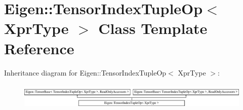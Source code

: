 \hypertarget{class_eigen_1_1_tensor_index_tuple_op}{}\section{Eigen\+:\+:Tensor\+Index\+Tuple\+Op$<$ Xpr\+Type $>$ Class Template Reference}
\label{class_eigen_1_1_tensor_index_tuple_op}
Inheritance diagram for Eigen\+:\+:Tensor\+Index\+Tuple\+Op$<$ Xpr\+Type $>$\+:\begin{figure}[H]
\begin{center}
\leavevmode
\includegraphics[height=1.206897cm]{class_eigen_1_1_tensor_index_tuple_op}
\end{center}
\end{figure}
